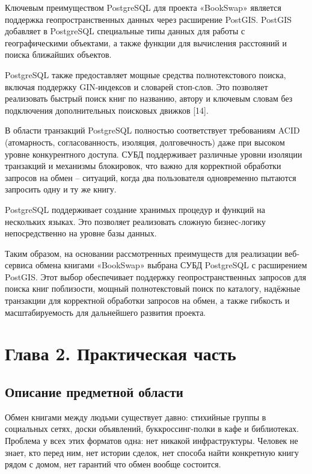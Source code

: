 \documentclass[14pt,a4paper]{extarticle}
\begin{document}
Ключевым преимуществом PostgreSQL для проекта «BookSwap» является
поддержка геопространственных данных через расширение PostGIS. PostGIS
добавляет в PostgreSQL специальные типы данных для работы с
географическими объектами, а также функции для вычисления расстояний и
поиска ближайших объектов.

PostgreSQL также предоставляет мощные средства полнотекстового поиска,
включая поддержку GIN-индексов и словарей стоп-слов. Это позволяет
реализовать быстрый поиск книг по названию, автору и ключевым словам без
подключения дополнительных поисковых движков [14].

В области транзакций PostgreSQL полностью соответствует требованиям ACID
(атомарность, согласованность, изоляция, долговечность) даже при высоком
уровне конкурентного доступа. СУБД поддерживает различные уровни
изоляции транзакций и механизмы блокировок, что важно для корректной
обработки запросов на обмен -- ситуаций, когда два пользователя
одновременно пытаются запросить одну и ту же книгу.

PostgreSQL поддерживает создание хранимых процедур и функций на
нескольких языках. Это позволяет реализовать сложную бизнес-логику
непосредственно на уровне базы данных.

Таким образом, на основании рассмотренных преимуществ для реализации
веб-сервиса обмена книгами «BookSwap» выбрана СУБД PostgreSQL с
расширением PostGIS. Этот выбор обеспечивает поддержку
геопространственных запросов для поиска книг поблизости, мощный
полнотекстовый поиск по каталогу, надёжные транзакции для корректной
обработки запросов на обмен, а также гибкость и масштабируемость для
дальнейшего развития проекта.

\newpage
{}
\section*{Глава 2. Практическая часть}

\subsection{Описание предметной области}

Обмен книгами между людьми существует давно: стихийные группы в
социальных сетях, доски объявлений, буккроссинг-полки в кафе и
библиотеках. Проблема у всех этих форматов одна: нет никакой
инфраструктуры. Человек не знает, кто перед ним, нет истории сделок, нет
способа найти конкретную книгу рядом с домом, нет гарантий что обмен
вообще состоится.
\end{document}
